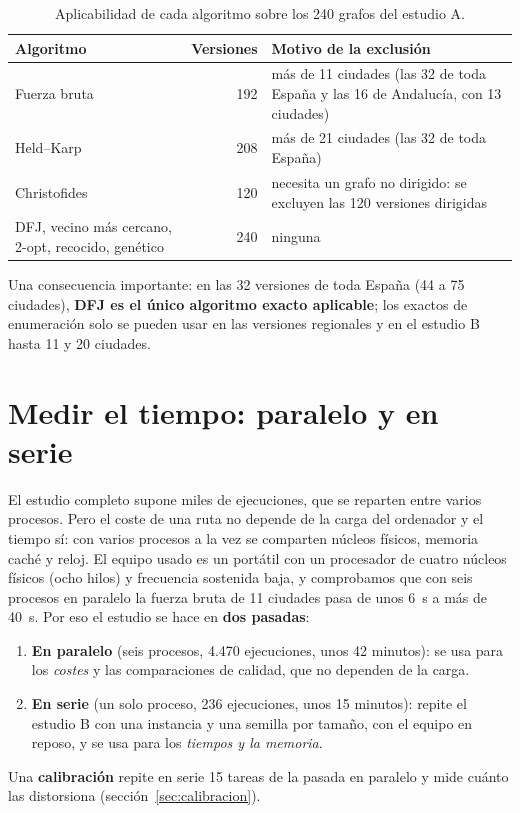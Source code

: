 \begin{table}[htbp]
  \centering
  \caption{Aplicabilidad de cada algoritmo sobre los 240 grafos del estudio A.}\label{tab:aplicabilidad}
  \small
  \begin{tabularx}{\linewidth}{@{}l r X@{}}
    \toprule
    Algoritmo & Versiones & Motivo de la exclusión \\
    \midrule
    Fuerza bruta & 192 & más de 11 ciudades (las 32 de toda España y las 16 de Andalucía, con 13 ciudades) \\
    Held--Karp & 208 & más de 21 ciudades (las 32 de toda España) \\
    Christofides & 120 & necesita un grafo no dirigido: se excluyen las 120 versiones dirigidas \\
    DFJ, vecino más cercano, 2-opt, recocido, genético & 240 & ninguna \\
    \bottomrule
  \end{tabularx}
\end{table}

Una consecuencia importante: en las 32 versiones de toda España (44 a 75 ciudades), \textbf{DFJ es el único algoritmo exacto aplicable}; los exactos de enumeración solo se pueden usar en las versiones regionales y en el estudio B hasta 11 y 20 ciudades.

\section{Medir el tiempo: paralelo y en serie}\label{sec:paralelo}

El estudio completo supone miles de ejecuciones, que se reparten entre varios procesos. Pero el coste de una ruta no depende de la carga del ordenador y el tiempo sí: con varios procesos a la vez se comparten núcleos físicos, memoria caché y reloj.
El equipo usado es un portátil con un procesador de cuatro núcleos físicos (ocho hilos) y frecuencia sostenida baja, y comprobamos que con seis procesos en paralelo la fuerza bruta de 11 ciudades pasa de unos 6~s a más de 40~s.
Por eso el estudio se hace en \textbf{dos pasadas}:
\begin{enumerate}
  \item \textbf{En paralelo} (seis procesos, 4.470 ejecuciones, unos 42 minutos): se usa para los \emph{costes} y las comparaciones de calidad, que no dependen de la carga.
  \item \textbf{En serie} (un solo proceso, 236 ejecuciones, unos 15 minutos): repite el estudio B con una instancia y una semilla por tamaño, con el equipo en reposo, y se usa para los \emph{tiempos y la memoria}.
\end{enumerate}
Una \textbf{calibración} repite en serie 15 tareas de la pasada en paralelo y mide cuánto las distorsiona (sección~\ref{sec:calibracion}).

